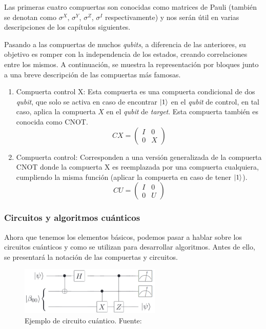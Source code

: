 Las primeras cuatro compuertas son conocidas como matrices de Pauli (también se denotan como $\sigma^{X}$, $\sigma^{Y}$, $\sigma^{Z}$, $\sigma^{I}$ respectivamente) y nos serán útil en varias descripciones de los capítulos siguientes. 

Pasando a las compuertas de muchos \textit{qubits}, a diferencia de las anteriores, su objetivo es romper con la independencia de los estados, creando correlaciones entre los mismos. A continuación, se muestra la representación por bloques junto a una breve descripción de las compuertas más famosas.


\begin{enumerate}
    \item Compuerta control X: Esta compuerta es una compuerta condicional de dos \textit{qubit}, que solo se activa en caso de encontrar $\ket{1}$ en el \textit{qubit} de control, en tal caso, aplica la compuerta $X$ en el \textit{qubit} de \textit{target}. Esta compuerta también es conocida como CNOT.
    \begin{equation*}
    CX = 
        \begin{pmatrix}
        I & 0\\
        0 & X
        \end{pmatrix}
    \end{equation*} 
    \item Compuerta control: Corresponden a una versión generalizada de la compuerta CNOT donde la compuerta X es reemplazada por una compuerta cualquiera, cumpliendo la misma función (aplicar la compuerta en caso de tener $\ket{1}$).
    \begin{equation*}
    CU = 
        \begin{pmatrix}
        I & 0\\
        0 & U
        \end{pmatrix}
    \end{equation*} 
\end{enumerate}


\subsubsection{Circuitos y algoritmos cuánticos}
Ahora que tenemos los elementos básicos, podemos pasar a hablar sobre los circuitos cuánticos y como se utilizan para desarrollar algoritmos. Antes de ello, se presentará la notación de las compuertas y circuitos.

\begin{figure}[H]
\centering
\includegraphics[width=0.6\textwidth]{figures/S2/EJEMPLOCIRCUITO.png}
\caption{\label{fig:CircuitExample} Ejemplo de circuito cuántico. Fuente: \cite{nielsen_chuang_2010}}
\end{figure}

